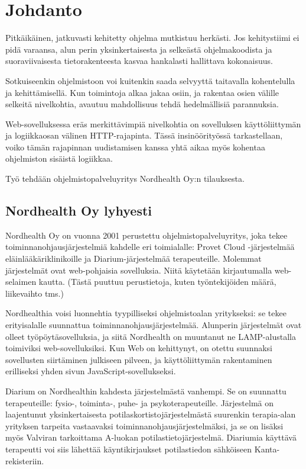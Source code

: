 
\chapter{Johdanto}

Pitkäikäinen, jatkuvasti kehitetty ohjelma mutkistuu herkästi. Jos kehitystiimi
ei pidä varaansa, alun perin yksinkertaisesta ja selkeästä ohjelmakoodista ja suoraviivaisesta tietorakenteesta kasvaa hankalasti hallittava kokonaisuus.

Sotkuiseenkin ohjelmistoon voi kuitenkin saada selvyyttä taitavalla kohentelulla
ja kehittämisellä. Kun toimintoja alkaa jakaa osiin, ja rakentaa osien välille
selkeitä nivelkohtia, avautuu mahdollisuus tehdä hedelmällisiä parannuksia.

Web-sovelluksessa eräs merkittävimpiä nivelkohtia on sovelluksen käyttöliittymän
ja logiikkaosan välinen HTTP-rajapinta. Tässä insinöörityössä tarkastellaan,
voiko tämän rajapinnan uudistamisen kanssa yhtä aikaa myös kohentaa ohjelmiston sisäistä logiikkaa.

Työ tehdään ohjelmistopalveluyritys Nordhealth Oy:n tilauksesta.
 
\section{Nordhealth Oy lyhyesti}


Nordhealth Oy on vuonna 2001 perustettu ohjelmistopalveluyritys, joka tekee toiminnanohjausjärjestelmiä kahdelle eri toimialalle: Provet Cloud -järjestelmää eläinlääkäriklinikoille ja Diarium-järjestelmää terapeuteille. Molemmat järjestelmät ovat web-pohjaisia sovelluksia. Niitä käytetään kirjautumalla web-selaimen kautta. (Tästä puuttuu perustietoja, kuten työntekijöiden määrä, liikevaihto tms.)

Nordhealthia voisi luonnehtia tyypilliseksi ohjelmistoalan yritykseksi: se tekee
erityisalalle suunnattua toiminnanohjausjärjestelmää. Alunperin järjestelmät
ovat olleet työpöytäsovelluksia, ja siitä Nordhealth on muuntanut ne
LAMP-alustalla toimiviksi web-sovelluksiksi. Kun Web on kehittynyt, on otettu
suunnaksi sovellusten siirtäminen julkiseen pilveen, ja käyttöliittymän
rakentaminen erilliseksi yhden sivun JavaScript-sovellukseksi.

Diarium on Nordhealthin kahdesta järjestelmästä vanhempi. Se on suunnattu terapeuteille: fysio-, toiminta-, puhe- ja psykoterapeuteille. Järjestelmä on laajentunut yksinkertaisesta potilaskortistojärjestelmästä suurenkin terapia-alan yrityksen tarpeita vastaavaksi toiminnanohjausjärjestelmäksi, ja se on lisäksi myös Valviran tarkoittama A-luokan potilastietojärjestelmä. Diariumia käyttävä terapeutti voi siis lähettää käyntikirjaukset potilastiedon sähköiseen Kanta-rekisteriin.

